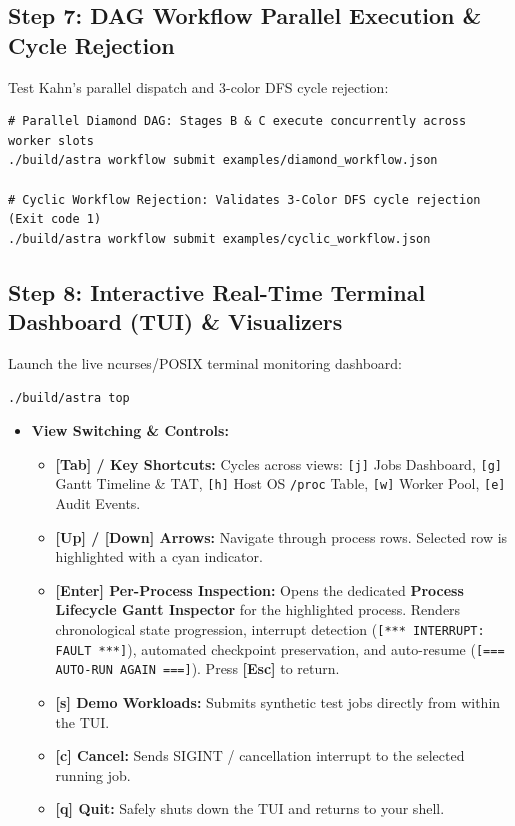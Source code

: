 \documentclass[10pt,a4paper]{article}
\begin{document}
\subsection{Step 7: DAG Workflow Parallel Execution \& Cycle Rejection}
Test Kahn's parallel dispatch and 3-color DFS cycle rejection:
\begin{lstlisting}[style=cmdstyle]
# Parallel Diamond DAG: Stages B & C execute concurrently across worker slots
./build/astra workflow submit examples/diamond_workflow.json

# Cyclic Workflow Rejection: Validates 3-Color DFS cycle rejection (Exit code 1)
./build/astra workflow submit examples/cyclic_workflow.json
\end{lstlisting}

\subsection{Step 8: Interactive Real-Time Terminal Dashboard (TUI) \& Visualizers}
Launch the live ncurses/POSIX terminal monitoring dashboard:
\begin{lstlisting}[style=cmdstyle]
./build/astra top
\end{lstlisting}
\begin{itemize}[leftmargin=*,itemsep=1pt,topsep=1pt]
    \item \textbf{View Switching \& Controls:}
    \begin{itemize}[leftmargin=*,itemsep=0.5pt,topsep=0.5pt]
        \item \textbf{[Tab] / Key Shortcuts:} Cycles across views: \texttt{[j]} Jobs Dashboard, \texttt{[g]} Gantt Timeline \& TAT, \texttt{[h]} Host OS \texttt{/proc} Table, \texttt{[w]} Worker Pool, \texttt{[e]} Audit Events.
        \item \textbf{[Up] / [Down] Arrows:} Navigate through process rows. Selected row is highlighted with a cyan indicator.
        \item \textbf{[Enter] Per-Process Inspection:} Opens the dedicated \textbf{Process Lifecycle Gantt Inspector} for the highlighted process. Renders chronological state progression, interrupt detection (\texttt{[*** INTERRUPT: FAULT ***]}), automated checkpoint preservation, and auto-resume (\texttt{[=== AUTO-RUN AGAIN ===]}). Press \textbf{[Esc]} to return.
        \item \textbf{[s] Demo Workloads:} Submits synthetic test jobs directly from within the TUI.
        \item \textbf{[c] Cancel:} Sends SIGINT / cancellation interrupt to the selected running job.
        \item \textbf{[q] Quit:} Safely shuts down the TUI and returns to your shell.
    \end{itemize}
\end{itemize}
\end{document}
